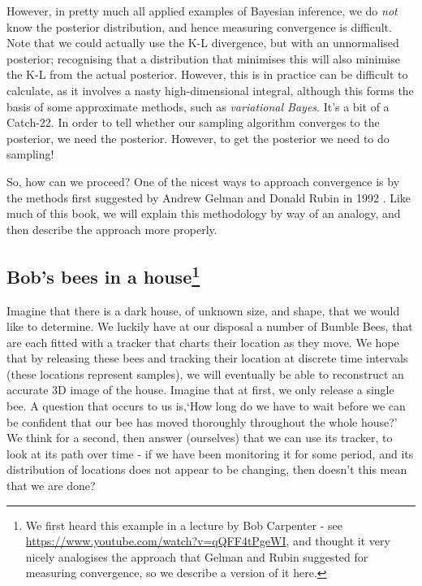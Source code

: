\documentclass[11pt,fullpage]{book}
\begin{document}
However, in pretty much all applied examples of Bayesian inference, we do \textit{not} know the posterior distribution, and hence measuring convergence is difficult. Note that we could actually use the K-L divergence, but with an unnormalised posterior; recognising that a distribution that minimises this will also minimise the K-L from the actual posterior. However, this is in practice can be difficult to calculate, as it involves a nasty high-dimensional integral, although this forms the basis of some approximate methods, such as \textit{variational Bayes}. It's a bit of a Catch-22. In order to tell whether our sampling algorithm converges to the posterior, we need the posterior. However, to get the posterior we need to do sampling!

So, how can we proceed? One of the nicest ways to approach convergence is by the methods first suggested by Andrew Gelman and Donald Rubin in 1992 \cite{gelman1992inference}. Like much of this book, we will explain this methodology by way of an analogy, and then describe the approach more properly.

\subsection{Bob's bees in a house\footnote{We first heard this example in a lecture by Bob Carpenter - see \url{https://www.youtube.com/watch?v=qQFF4tPgeWI}, and thought it very nicely analogises the approach that Gelman and Rubin suggested for measuring convergence, so we describe a version of it here.}}

Imagine that there is a dark house, of unknown size, and shape, that we would like to determine. We luckily have at our disposal a number of Bumble Bees, that are each fitted with a tracker that charts their location as they move. We hope that by releasing these bees and tracking their location at discrete time intervals (these locations represent samples), we will eventually be able to reconstruct an accurate 3D image of the house. Imagine that at first, we only release a single bee. A question that occurs to us is,`How long do we have to wait before we can be confident that our bee has moved thoroughly throughout the whole house?' We think for a second, then answer (ourselves) that we can use its tracker, to look at its path over time - if we have been monitoring it for some period, and its distribution of locations does not appear to be changing, then doesn't this mean that we are done? 
\end{document}
